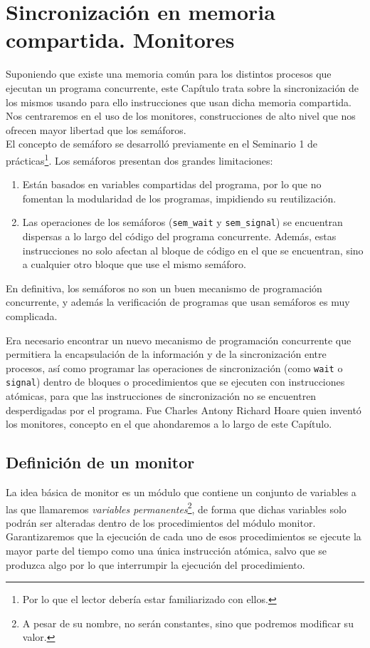 \chapter{Sincronización en memoria compartida. Monitores}

Suponiendo que existe una memoria común para los distintos procesos que ejecutan un programa concurrente, este Capítulo trata sobre la sincronización de los mismos usando para ello instrucciones que usan dicha memoria compartida. Nos centraremos en el uso de los monitores, construcciones de alto nivel que nos ofrecen mayor libertad que los semáforos.\\

El concepto de semáforo se desarrolló previamente en el Seminario 1 de prácticas\footnote{Por lo que el lector debería estar familiarizado con ellos.}. Los semáforos presentan dos grandes limitaciones:
\begin{enumerate}
    \item Están basados en variables compartidas del programa, por lo que no fomentan la modularidad de los programas, impidiendo su reutilización.
    \item Las operaciones de los semáforos (\verb|sem_wait| y \verb|sem_signal|) se encuentran dispersas a lo largo del código del programa concurrente. Además, estas instrucciones no solo afectan al bloque de código en el que se encuentran, sino a cualquier otro bloque que use el mismo semáforo.
\end{enumerate}
En definitiva, los semáforos no son un buen mecanismo de programación concurrente, y además la verificación de programas que usan semáforos es muy complicada. 

Era necesario encontrar un nuevo mecanismo de programación concurrente que permitiera la encapsulación de la información y de la sincronización entre procesos, así como programar las operaciones de sincronización (como \verb|wait| o \verb|signal|) dentro de bloques o procedimientos que se ejecuten con instrucciones atómicas, para que las instrucciones de sincronización no se encuentren desperdigadas por el programa.
Fue Charles Antony Richard Hoare quien inventó los monitores, concepto en el que ahondaremos a lo largo de este Capítulo.

\section{Definición de un monitor}
La idea básica de monitor es un módulo que contiene un conjunto de variables a las que llamaremos \textit{variables permanentes}\footnote{A pesar de su nombre, no serán constantes, sino que podremos modificar su valor.}, de forma que dichas variables solo podrán ser alteradas dentro de los procedimientos del módulo monitor. Garantizaremos que la ejecución de cada uno de esos procedimientos se ejecute la mayor parte del tiempo como una única instrucción atómica, salvo que se produzca algo por lo que interrumpir la ejecución del procedimiento.\\

